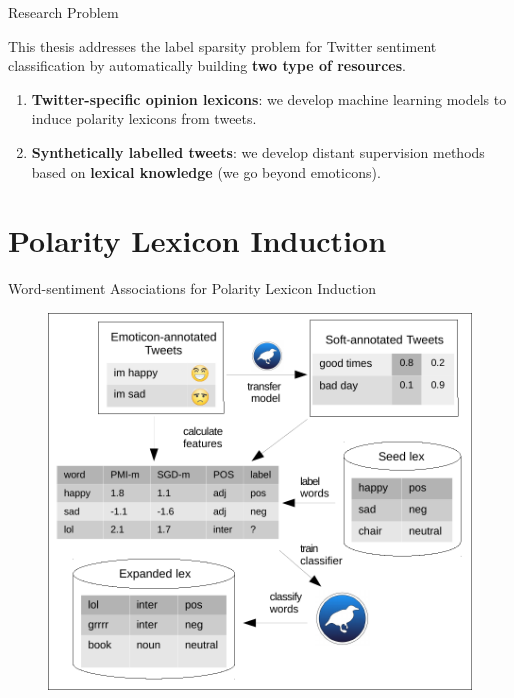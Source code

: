 \documentclass[handout]{beamer}
\begin{document}
\begin{frame}{Research Problem}

This thesis addresses the label sparsity problem for Twitter sentiment classification by automatically building \textbf{two type of resources}. 
\begin{enumerate}
 \item \textbf{Twitter-specific opinion lexicons}: we develop machine learning models to induce polarity lexicons from tweets. 
 \item  \textbf{Synthetically labelled tweets}: we develop distant supervision methods based on \textbf{lexical knowledge} (we go beyond emoticons). 
 \end{enumerate}

\end{frame}


\section{Polarity Lexicon Induction}


\begin{frame}{Word-sentiment Associations for Polarity Lexicon Induction}
\begin{figure}[htb]
	\centering
	 \includegraphics[scale=0.5]{pics/diagramcrop.pdf}
	\label{fig:sosgd}
\end{figure}
\end{frame}
\end{document}
